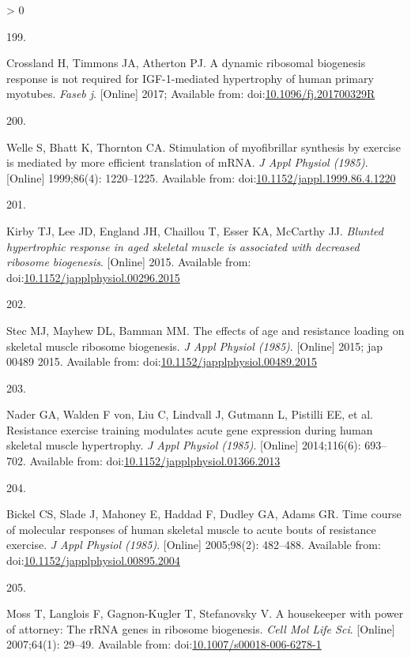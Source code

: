 \documentclass[twoside,10pt]{gihclass} %
\newlength{\cslhangindent}
\newlength{\csllabelwidth}
\newenvironment{CSLReferences}[3] %
 {%
  \setlength{\parindent}{0pt}
  \ifodd #1 \everypar{\setlength{\hangindent}{\cslhangindent}}\ignorespaces\fi
  \ifnum #2 > 0
  \setlength{\parskip}{#2\baselineskip}
  \fi
 }%
 {}
\newcommand{\CSLLeftMargin}[1]{\parbox[t]{\maxof{\widthof{#1}}{\csllabelwidth}}{#1}}
\newcommand{\CSLRightInline}[1]{\parbox[t]{\linewidth}{#1}}
\begin{document}
\begin{CSLReferences}{0}{0}
\leavevmode\hypertarget{ref-RN1929}{}%
\CSLLeftMargin{199. }
\CSLRightInline{Crossland H, Timmons JA, Atherton PJ. A dynamic ribosomal biogenesis response is not required for IGF-1-mediated hypertrophy of human primary myotubes. \emph{Faseb j}. {[}Online{]} 2017; Available from: doi:\href{https://doi.org/10.1096/fj.201700329R}{10.1096/fj.201700329R}}

\leavevmode\hypertarget{ref-RN2155}{}%
\CSLLeftMargin{200. }
\CSLRightInline{Welle S, Bhatt K, Thornton CA. Stimulation of myofibrillar synthesis by exercise is mediated by more efficient translation of mRNA. \emph{J Appl Physiol (1985)}. {[}Online{]} 1999;86(4): 1220--1225. Available from: doi:\href{https://doi.org/10.1152/jappl.1999.86.4.1220}{10.1152/jappl.1999.86.4.1220}}

\leavevmode\hypertarget{ref-RN1631}{}%
\CSLLeftMargin{201. }
\CSLRightInline{Kirby TJ, Lee JD, England JH, Chaillou T, Esser KA, McCarthy JJ. \emph{Blunted hypertrophic response in aged skeletal muscle is associated with decreased ribosome biogenesis}. {[}Online{]} 2015. Available from: doi:\href{https://doi.org/10.1152/japplphysiol.00296.2015}{10.1152/japplphysiol.00296.2015}}

\leavevmode\hypertarget{ref-RN1656}{}%
\CSLLeftMargin{202. }
\CSLRightInline{Stec MJ, Mayhew DL, Bamman MM. The effects of age and resistance loading on skeletal muscle ribosome biogenesis. \emph{J Appl Physiol (1985)}. {[}Online{]} 2015; jap 00489 2015. Available from: doi:\href{https://doi.org/10.1152/japplphysiol.00489.2015}{10.1152/japplphysiol.00489.2015}}

\leavevmode\hypertarget{ref-RN1037}{}%
\CSLLeftMargin{203. }
\CSLRightInline{Nader GA, Walden F von, Liu C, Lindvall J, Gutmann L, Pistilli EE, et al. Resistance exercise training modulates acute gene expression during human skeletal muscle hypertrophy. \emph{J Appl Physiol (1985)}. {[}Online{]} 2014;116(6): 693--702. Available from: doi:\href{https://doi.org/10.1152/japplphysiol.01366.2013}{10.1152/japplphysiol.01366.2013}}

\leavevmode\hypertarget{ref-RN1520}{}%
\CSLLeftMargin{204. }
\CSLRightInline{Bickel CS, Slade J, Mahoney E, Haddad F, Dudley GA, Adams GR. Time course of molecular responses of human skeletal muscle to acute bouts of resistance exercise. \emph{J Appl Physiol (1985)}. {[}Online{]} 2005;98(2): 482--488. Available from: doi:\href{https://doi.org/10.1152/japplphysiol.00895.2004}{10.1152/japplphysiol.00895.2004}}

\leavevmode\hypertarget{ref-RN1820}{}%
\CSLLeftMargin{205. }
\CSLRightInline{Moss T, Langlois F, Gagnon-Kugler T, Stefanovsky V. A housekeeper with power of attorney: The rRNA genes in ribosome biogenesis. \emph{Cell Mol Life Sci}. {[}Online{]} 2007;64(1): 29--49. Available from: doi:\href{https://doi.org/10.1007/s00018-006-6278-1}{10.1007/s00018-006-6278-1}}


\end{CSLReferences}
\end{document}
